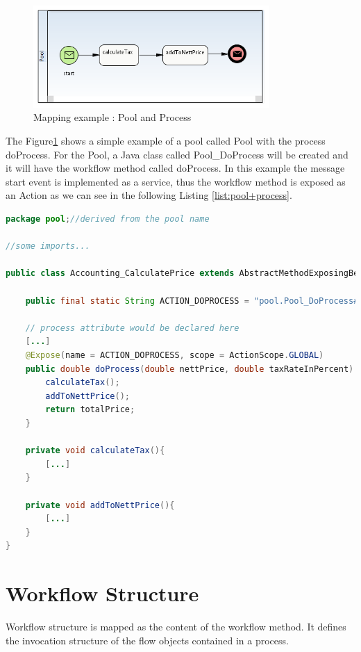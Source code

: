 \begin{figure}[h]
	\centering
		\includegraphics[width=0.80\textwidth]{images/mapping/pool_and_process.png}
	\caption{Mapping example : Pool and Process}
	\label{fig:pool+process}
\end{figure}

The Figure\ref{fig:pool+process} shows a simple example of a pool called Pool with the process doProcess. For the Pool, a Java class called Pool\_DoProcess will be created and it will have the workflow method called doProcess. In this example the message start event is implemented as a service, thus the workflow method is exposed as an Action as we can see in the following Listing \ref{list:pool+process}.  
\begin{lstlisting}[language = Java, caption =  Mapped element: Pool and Process (Figure \ref{fig:pool+process}), label = list:pool+process]
package pool;//derived from the pool name

//some imports...

public class Accounting_CalculatePrice extends AbstractMethodExposingBean{
	
	public final static String ACTION_DOPROCESS = "pool.Pool_DoProcess#doProcess"; 
	
	// process attribute would be declared here
	[...]
	@Expose(name = ACTION_DOPROCESS, scope = ActionScope.GLOBAL)
	public double doProcess(double nettPrice, double taxRateInPercent) {
		calculateTax();
		addToNettPrice();
		return totalPrice;
	}
	
	private void calculateTax(){
		[...]
	}
	
	private void addToNettPrice(){
		[...]
	}
}
\end{lstlisting}


\section{Workflow Structure}
Workflow structure is mapped as the content of the workflow method. It defines the invocation structure of the flow objects contained in a process.

